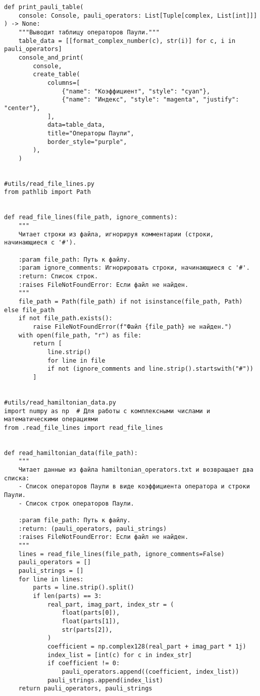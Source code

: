 \documentclass[a4paper]{report}
\begin{document}
\begin{lstlisting}
def print_pauli_table(
    console: Console, pauli_operators: List[Tuple[complex, List[int]]]
) -> None:
    """Выводит таблицу операторов Паули."""
    table_data = [[format_complex_number(c), str(i)] for c, i in pauli_operators]
    console_and_print(
        console,
        create_table(
            columns=[
                {"name": "Коэффициент", "style": "cyan"},
                {"name": "Индекс", "style": "magenta", "justify": "center"},
            ],
            data=table_data,
            title="Операторы Паули",
            border_style="purple",
        ),
    )


#utils/read_file_lines.py
from pathlib import Path


def read_file_lines(file_path, ignore_comments):
    """
    Читает строки из файла, игнорируя комментарии (строки, начинающиеся с '#').

    :param file_path: Путь к файлу.
    :param ignore_comments: Игнорировать строки, начинающиеся с '#'.
    :return: Список строк.
    :raises FileNotFoundError: Если файл не найден.
    """
    file_path = Path(file_path) if not isinstance(file_path, Path) else file_path
    if not file_path.exists():
        raise FileNotFoundError(f"Файл {file_path} не найден.")
    with open(file_path, "r") as file:
        return [
            line.strip()
            for line in file
            if not (ignore_comments and line.strip().startswith("#"))
        ]


#utils/read_hamiltonian_data.py
import numpy as np  # Для работы с комплексными числами и математическими операциями
from .read_file_lines import read_file_lines


def read_hamiltonian_data(file_path):
    """
    Читает данные из файла hamiltonian_operators.txt и возвращает два списка:
    - Список операторов Паули в виде коэффициента оператора и строки Паули.
    - Список строк операторов Паули.

    :param file_path: Путь к файлу.
    :return: (pauli_operators, pauli_strings)
    :raises FileNotFoundError: Если файл не найден.
    """
    lines = read_file_lines(file_path, ignore_comments=False)
    pauli_operators = []
    pauli_strings = []
    for line in lines:
        parts = line.strip().split()
        if len(parts) == 3:
            real_part, imag_part, index_str = (
                float(parts[0]),
                float(parts[1]),
                str(parts[2]),
            )
            coefficient = np.complex128(real_part + imag_part * 1j)
            index_list = [int(c) for c in index_str]
            if coefficient != 0:
                pauli_operators.append((coefficient, index_list))
            pauli_strings.append(index_list)
    return pauli_operators, pauli_strings



\end{lstlisting}
\end{document}
